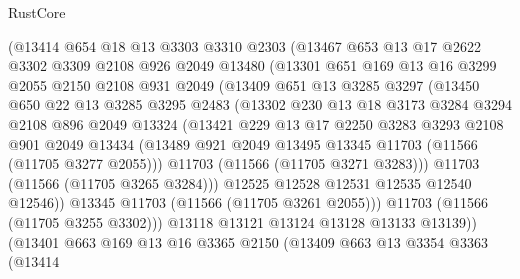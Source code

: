 \begin{lexlean}{RustCore}
\begin{coremodule}
            (@13414
              @654
              @18
              @13
              @3303
              @3310
              @2303
              (@13467
                @653
                @13
                @17
                @2622
                @3302
                @3309
                @2108
                @926
                @2049
                @13480
                (@13301
                  @651
                  @169
                  @13
                  @16
                  @3299
                  @2055
                  @2150
                  @2108
                  @931
                  @2049
                  (@13409
                    @651
                    @13
                    @3285
                    @3297
                    (@13450
                      @650
                      @22
                      @13
                      @3285
                      @3295
                      @2483
                      (@13302
                        @230
                        @13
                        @18
                        @3173
                        @3284
                        @3294
                        @2108
                        @896
                        @2049
                        @13324
                        (@13421
                          @229
                          @13
                          @17
                          @2250
                          @3283
                          @3293
                          @2108
                          @901
                          @2049
                          @13434
                          (@13489 @921 @2049 @13495 @13345 @11703 (@11566 (@11705 @3277 @2055)))
                          @11703
                          (@11566 (@11705 @3271 @3283)))
                        @11703
                        (@11566 (@11705 @3265 @3284)))
                      @12525
                      @12528
                      @12531
                      @12535
                      @12540
                      @12546))
                  @13345
                  @11703
                  (@11566 (@11705 @3261 @2055)))
                @11703
                (@11566 (@11705 @3255 @3302)))
              @13118
              @13121
              @13124
              @13128
              @13133
              @13139))
          (@13401
            @663
            @169
            @13
            @16
            @3365
            @2150
            (@13409
              @663
              @13
              @3354
              @3363
              (@13414

\end{coremodule}
\end{lexlean}
